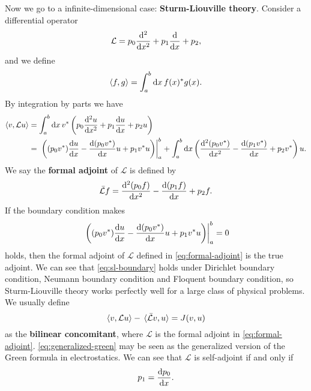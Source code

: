 \documentclass[hyperref, a4paper]{article}
\newcommand*{\concept}[1]{{\textbf{#1}}}
\begin{document}
Now we go to a infinite-dimensional case: \concept{Sturm-Liouville theory}. Consider a differential operator 
\begin{equation}
    \mathcal{L} = p_0 \dv[2]{x} + p_1 \dv{x} + p_2,
\end{equation}
and we define 
\begin{equation}
    \expval{f, g} = \int_{a}^b \dd{x} f(x)^* g(x).
\end{equation}
By integration by parts we have 
\[
    \begin{aligned}
        \expval{v, \mathcal{L}u} &= \int_a^b \dd{x} v^* \left( p_0 \dv[2]{u}{x} + p_1 \dv{u}{x} + p_2 u \right) \\
        &= \eval*{\left( (p_0 v^*) \dv{u}{x} - \dv{(p_0 v^*)}{x} u + p_1 v^* u \right) }_{a}^{b} 
        + \int_a^b \dd{x} \left(\dv[2]{(p_0 v^*)}{x} - \dv{(p_1 v^*)}{x} + p_2 v^*\right) u .
    \end{aligned}
\]
We say the \concept{formal adjoint} of $\mathcal{L}$ is defined by
\begin{equation}
    \bar{\mathcal{L}} f = \dv[2]{(p_0 f)}{x} - \dv{(p_1 f)}{x} + p_2 f.
    \label{eq:formal-adjoint}
\end{equation}
If the boundary condition makes 
\begin{equation}
    \eval*{\left( (p_0 v^*) \dv{u}{x} - \dv{(p_0 v^*)}{x} u + p_1 v^* u \right) }_{a}^{b} = 0
    \label{eq:sl-boundary}
\end{equation}
holds, then the formal adjoint of $\mathcal{L}$ defined in \eqref{eq:formal-adjoint} is the true adjoint.
We can see that \eqref{eq:sl-boundary} holds under Dirichlet boundary condition, Neumann boundary condition 
and Floquent boundary condition, so Sturm-Liouville theory works perfectly well for a large class of physical problems.
We usually define 
\begin{equation}
    \expval{v, \mathcal{L} u} - \expval*{\bar{\mathcal{L}} v, u} = J(v, u)
    \label{eq:generalized-green}
\end{equation}
as the \concept{bilinear concomitant}, where $\mathcal{L}$ is the formal adjoint in \eqref{eq:formal-adjoint}.
\eqref{eq:generalized-green} may be seen as the generalized version of the Green formula in electrostatics.
We can see that $\mathcal{L}$ is self-adjoint if and only if 
\begin{equation}
    p_1 = \dv{p_0}{x}.
    \label{eq:self-adjoint-condition}
\end{equation}
\end{document}
